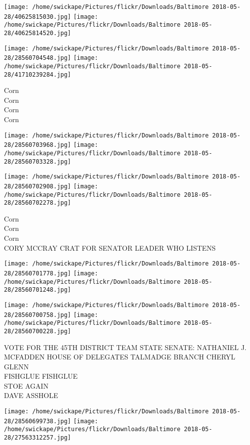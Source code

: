 \documentclass[10pt,letterpaper]{article}
\begin{document}
\texttt{[image: /home/swickape/Pictures/flickr/Downloads/Baltimore 2018-05-28/40625815030.jpg]}
\texttt{[image: /home/swickape/Pictures/flickr/Downloads/Baltimore 2018-05-28/40625814520.jpg]}

\texttt{[image: /home/swickape/Pictures/flickr/Downloads/Baltimore 2018-05-28/28560704548.jpg]}
\texttt{[image: /home/swickape/Pictures/flickr/Downloads/Baltimore 2018-05-28/41710239284.jpg]}

Corn\\
Corn\\
Corn\\
Corn
\pagebreak

\texttt{[image: /home/swickape/Pictures/flickr/Downloads/Baltimore 2018-05-28/28560703968.jpg]}
\texttt{[image: /home/swickape/Pictures/flickr/Downloads/Baltimore 2018-05-28/28560703328.jpg]}

\texttt{[image: /home/swickape/Pictures/flickr/Downloads/Baltimore 2018-05-28/28560702908.jpg]}
\texttt{[image: /home/swickape/Pictures/flickr/Downloads/Baltimore 2018-05-28/28560702278.jpg]}

Corn\\
Corn\\
Corn\\
CORY MCCRAY CRAT FOR SENATOR LEADER WHO LISTENS
\pagebreak

\texttt{[image: /home/swickape/Pictures/flickr/Downloads/Baltimore 2018-05-28/28560701778.jpg]}
\texttt{[image: /home/swickape/Pictures/flickr/Downloads/Baltimore 2018-05-28/28560701248.jpg]}

\texttt{[image: /home/swickape/Pictures/flickr/Downloads/Baltimore 2018-05-28/28560700758.jpg]}
\texttt{[image: /home/swickape/Pictures/flickr/Downloads/Baltimore 2018-05-28/28560700228.jpg]}

VOTE FOR THE 45TH DISTRICT TEAM STATE SENATE: NATHANIEL J. MCFADDEN HOUSE OF DELEGATES TALMADGE BRANCH CHERYL GLENN\\
FISHGLUE FISHGLUE\\
STOE AGAIN\\
DAVE ASSHOLE
\pagebreak

\texttt{[image: /home/swickape/Pictures/flickr/Downloads/Baltimore 2018-05-28/28560699738.jpg]}
\texttt{[image: /home/swickape/Pictures/flickr/Downloads/Baltimore 2018-05-28/27563312257.jpg]}
\end{document}
